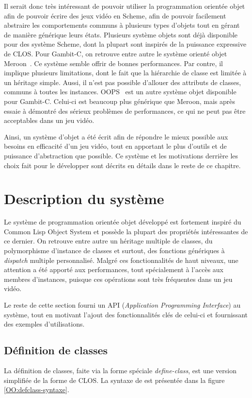\documentclass[12pt,oneside,letterpaper,francais]{book}
\newcommand{\scheme}[1]{\selectlanguage{english}{\tt #1}\selectlanguage{french}}
\begin{document}
Il serait donc très intéressant de pouvoir utiliser la programmation
orientée objet afin de pouvoir écrire des jeux vidéo en Scheme, afin
de pouvoir facilement abstraire les comportements communs à plusieurs
types d'objets tout en gérant de manière générique leurs
états. Plusieurs système objets sont déjà disponible pour des système
Scheme, dont la plupart sont inspirés de la puissance expressive de
CLOS. Pour Gambit-C, on retrouve entre autre le système orienté objet
Meroon~\cite{MEROON}. Ce système semble offrir de bonnes
performances. Par contre, il implique plusieurs limitations, dont le
fait que la hiérarchie de classe est limitée à un héritage
simple. Aussi, il n'est pas possible d'allouer des attributs de
classes, communs à toutes les instances. OOPS~\cite{OOPS} est un autre
système objet disponible pour Gambit-C. Celui-ci est beaucoup plus
générique que Meroon, mais après essaie à démontré des sérieux
problèmes de performances, ce qui ne peut pas être acceptables dans un
jeu vidéo.

Ainsi, un système d'objet a été écrit afin de répondre le mieux
possible aux besoins en efficacité d'un jeu vidéo, tout en apportant
le plus d'outils et de puissance d'abstraction que possible. Ce
système et les motivations derrière les choix fait pour le développer
sont décrits en détails dans le reste de ce chapitre.


\section{Description du système}

Le système de programmation orientée objet développé est fortement
inspiré du Common Lisp Object System et possède la plupart des
propriétés intéressantes de ce dernier. On retrouve entre autre un
héritage multiple de classes, du polymorphisme d'instance de classes
et surtout, des fonctions génériques à \textit{dispatch} multiple
personnalisé. Malgré ces fonctionnalités de haut niveaux, une
attention a été apporté aux performances, tout spécialement à l'accès
aux membres d'instances, puisque ces opérations sont très fréquentes
dans un jeu vidéo.

Le reste de cette section fourni un API (\textit{Application
  Programming Interface}) au système, tout en motivant l'ajout des
fonctionnalités clés de celui-ci et fournissant des exemples
d'utilisations.

\subsection{Définition de classes}
La définition de classes, faite via la forme spéciale
\textit{define-class}, est une version simplifiée de la forme
\scheme{defclass} de CLOS. La syntaxe de \scheme{define-class} est
présentée dans la figure \ref{OO:defclass-syntaxe}.
\end{document}
